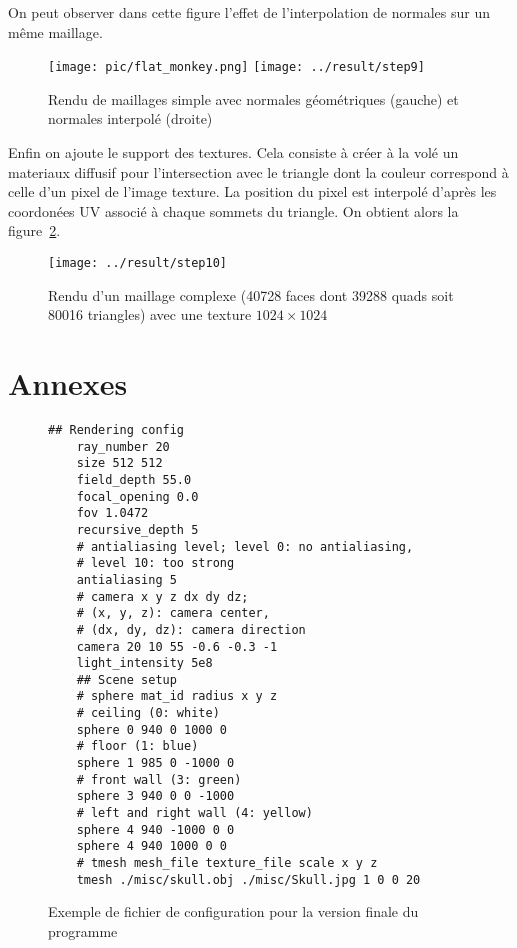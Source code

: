 \documentclass[12pt]{article}
\begin{document}
On peut observer dans cette figure l'effet de l'interpolation de normales sur un même maillage.

\begin{figure}[ht]
  \centering
  \texttt{[image: pic/flat\_monkey.png]}
  \texttt{[image: ../result/step9]}
  \caption{Rendu de maillages simple avec normales géométriques (gauche) et normales interpolé (droite)}\label{fig:step9}
\end{figure}

Enfin on ajoute le support des textures.
Cela consiste à créer à la volé un materiaux diffusif pour l'intersection avec le triangle dont la couleur correspond à celle d'un pixel de l'image texture.
La position du pixel est interpolé d'après les coordonées UV associé à chaque sommets du triangle.
On obtient alors la figure~\ref{fig:step10}.

\begin{figure}[ht]
  \centering
  \texttt{[image: ../result/step10]}
  \caption{Rendu d'un maillage complexe (40728 faces dont 39288 quads soit 80016 triangles) avec une texture $1024\times1024$}\label{fig:step10}
\end{figure}

\clearpage
\section*{Annexes}

\begin{figure}[ht!]
  \begin{lstlisting}[frame=single]
    ## Rendering config
    ray_number 20
    size 512 512
    field_depth 55.0
    focal_opening 0.0
    fov 1.0472
    recursive_depth 5
    # antialiasing level; level 0: no antialiasing,
    # level 10: too strong
    antialiasing 5
    # camera x y z dx dy dz;
    # (x, y, z): camera center,
    # (dx, dy, dz): camera direction
    camera 20 10 55 -0.6 -0.3 -1
    light_intensity 5e8
    ## Scene setup
    # sphere mat_id radius x y z
    # ceiling (0: white)
    sphere 0 940 0 1000 0
    # floor (1: blue)
    sphere 1 985 0 -1000 0
    # front wall (3: green)
    sphere 3 940 0 0 -1000
    # left and right wall (4: yellow)
    sphere 4 940 -1000 0 0
    sphere 4 940 1000 0 0
    # tmesh mesh_file texture_file scale x y z
    tmesh ./misc/skull.obj ./misc/Skull.jpg 1 0 0 20
  \end{lstlisting}
  \caption{Exemple de fichier de configuration pour la version finale du programme}\label{code:config}
\end{figure}
\end{document}
